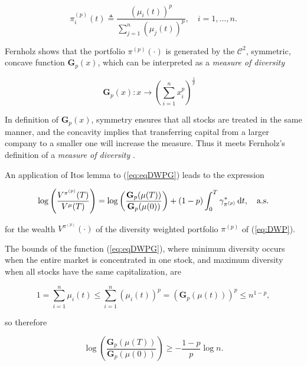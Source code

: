 \documentclass[british]{amsart} \usepackage{lmodern}
\numberwithin{equation}{section} \numberwithin{figure}{section}
\theoremstyle{plain} \newtheorem{thm}{\protect\theoremname}[section]
\theoremstyle{definition} \newtheorem{defn}[thm]{\protect\definitionname}
\theoremstyle{plain} \newtheorem{assumption}[thm]{\protect\assumptionname}
\theoremstyle{plain} \newtheorem{lem}[thm]{\protect\lemmaname}
\theoremstyle{plain} \newtheorem{prop}[thm]{\protect\propositionname}
\theoremstyle{remark} \newtheorem{rem}[thm]{\protect\remarkname}
\theoremstyle{plain} \newtheorem{cor}[thm]{\protect\corollaryname}
\renewcommand{\d}[1]{\mathop{\mathrm{d}{#1}}}
\begin{document}
\begin{equation}
 \label{eq:DWP}
 \pi_{i}^{(p)}(t) \triangleq 
      \frac{ \left(\mu_{i}(t)\right)^{p} }
           {\sum_{j=1}^{n}\left(\mu_{j}(t)\right)^{p}},
   \quad i=1,...,n.
\end{equation}

\newcommand{\Gp}[1]{\mathbf{G}_{p}(#1)}

Fernholz \cite[Equation 7.3]{fernholz2009} shows that the portfolio
$\pi^{(p)}(\cdot)$ is generated by the $\mathcal{C}^2$, symmetric, concave
function $\Gp{x}$, which can be interpreted as a \textit{measure of diversity}

\begin{equation}
  \label{eq:eqDWPG}
  \Gp{x}:x\to\left(\sum_{i=1}^{n}x_{i}^{p}\right)^{\frac{1}{p}}
  \quad
\end{equation}

In definition of $\Gp{x}$, symmetry ensures that all stocks are treated in the
same manner, and the concavity implies that transferring capital from a larger
company to a smaller one will increase the measure. Thus it meets Fernholz's definition
of a \textit{measure of diversity} \cite[Definition 4.3]{fernholz1999pgf}.

An application of Itos lemma to (\ref{eq:eqDWPG}) leads to the expression

\begin{equation}
  \log \left( \frac{V^{\pi^{(p)}}(T)}{V^{\mu}(T)} \right) = 
  \log \left( \frac{\Gp{\mu(T)}}{\Gp{\mu(0)}} \right) + 
    (1-p)\int_{0}^{T}\gamma_{\pi^{(p)}}^{*}\d{t},
  \quad \almostsurely
\end{equation}

for the wealth $V^{\pi^{(p)}}(\cdot)$ of the diversity weighted portfolio
$\pi^{(p)}$ of (\ref{eq:DWP}).

The bounds of the function (\ref{eq:eqDWPG}), where minimum diversity occurs when the
entire market is concentrated in one stock, and maximum diversity when all
stocks have the same capitalization, are

\begin{equation}
  1 = \sum_{i=1}^{n} \mu_{i}(t) \le \sum_{i=1}^{n} (\mu_{i}(t))^p
    = \left( \Gp{\mu(t)} \right)^p \le n^{1-p},
\end{equation}

so therefore

\begin{equation}
  \log \left( \frac{\Gp{\mu(T)}}{\Gp{\mu(0)}} \right) \ge 
       -\frac{1-p}{p} \log{n}. 
\end{equation}
\end{document}
